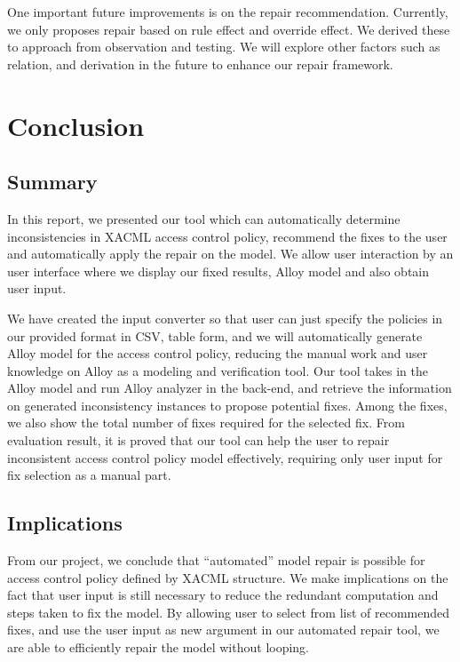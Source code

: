 \documentclass{acm_proc_article-sp}
\begin{document}
One important future improvements is on the repair recommendation. Currently, we only proposes repair based on rule effect and override effect. We derived these to approach from observation and testing. We will explore other factors such as relation, and derivation in the future to enhance our repair framework.

\section{Conclusion}

\subsection{Summary}
In this report, we presented our tool which can automatically determine inconsistencies in XACML access control policy, recommend the fixes to the user and automatically apply the repair on the model. We allow user interaction by an user interface where we display our fixed results, Alloy model and also obtain user input.

We have created the input converter so that user can just specify the policies in our provided format in CSV, table form, and we will automatically generate Alloy model for the access control policy, reducing the manual work and user knowledge on Alloy as a modeling and verification tool. Our tool takes in the Alloy model and run Alloy analyzer in the back-end, and retrieve the information on generated inconsistency instances to propose potential fixes. Among the fixes, we also show the total number of fixes required for the selected fix. From evaluation result, it is proved that our tool can help the user to repair inconsistent access control policy model effectively, requiring only user input for fix selection as a manual part. 

\subsection{Implications}

From our project, we conclude that ``automated'' model repair is possible for access control policy defined by XACML structure. We make implications on the fact that user input is still necessary to reduce the redundant computation and steps taken to fix the model. By allowing user to select from list of recommended fixes, and use the user input as new argument in our automated repair tool, we are able to efficiently repair the model without looping.
\end{document}
